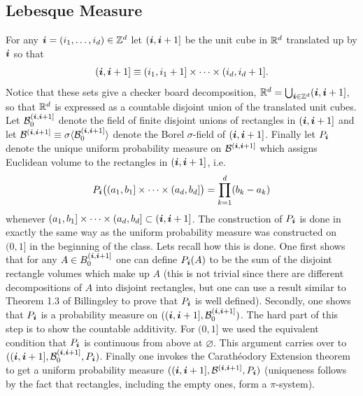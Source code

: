 \subsection{Lebesque Measure}



For any $\boldsymbol i=(i_1,\ldots, i_d)\in\Bbb Z^d$ let $(\boldsymbol i,\boldsymbol i+1]$ be the unit cube in $\Bbb R^d$ translated up by $\boldsymbol i$ so that
\[(\boldsymbol i,\boldsymbol i+1] \equiv (i_1, i_1+1]\times \cdots \times (i_d,i_d + 1].  \]
Notice that these sets give a checker board decomposition, $\Bbb R^d=\bigcup_{\boldsymbol i\in\Bbb Z^d} (\boldsymbol i,\boldsymbol i+1] $, so that $\Bbb R^d$ is expressed as a countable disjoint union of the translated unit cubes. Let $\mathcal B_{0}^{(\boldsymbol i,\boldsymbol i+1] }$ denote the field of finite disjoint unions of rectangles in $(\boldsymbol i,\boldsymbol i+1] $ and let $\mathcal B^{(\boldsymbol i,\boldsymbol i+1] }\equiv \sigma \langle \mathcal B_{0}^{(\boldsymbol i,\boldsymbol i+1] }\rangle $ denote the Borel $\sigma$-field of  $(\boldsymbol i,\boldsymbol i+1]$. Finally let $P_{\boldsymbol i}$ denote the unique uniform probability measure on $\mathcal B^{(\boldsymbol i,\boldsymbol i+1] }$ which assigns Euclidean volume  to the rectangles in  $(\boldsymbol i,\boldsymbol i+1] $, i.e.
\[ P_{\boldsymbol i}\bigl( (a_1,b_1]\times \cdots \times (a_d,b_d]\bigr)=\prod_{k=1}^d (b_k - a_k) \]
whenever $(a_1,b_1]\times \cdots \times (a_d,b_d]\subset (\boldsymbol i,\boldsymbol i+1]$. The construction of $P_{\boldsymbol i}$ is done in exactly the same way as the uniform probability measure was constructed on $(0,1]$ in the beginning of the class. Lets recall how this is done. One first shows that for any $A\in \mathcal \mathcal B_{0}^{(\boldsymbol i,\boldsymbol i+1] }$ one can define $P_{\boldsymbol i}(A)$ to be the sum  of the disjoint rectangle volumes which make up $A$ (this is not trivial since there are different decompositions of $A$ into disjoint rectangles, but one can use a result similar to Theorem 1.3 of Billingsley to prove that $P_{\boldsymbol i}$ is well defined).  Secondly, one shows that $P_{\boldsymbol i}$ is a probability measure on $((\boldsymbol i, \boldsymbol i +1],\mathcal B_{0}^{(\boldsymbol i,\boldsymbol i+1] })$. The hard part of this step is to  show the countable additivity. For $(0,1]$ we used the equivalent condition that  $P_{\boldsymbol i}$ is continuous from above at $\varnothing$. This argument carries over to $((\boldsymbol i, \boldsymbol i +1],\mathcal B_{0}^{(\boldsymbol i,\boldsymbol i+1] }, P_{\boldsymbol i})$. Finally one invokes the Carath\'eodory Extension theorem to get a uniform probability measure $((\boldsymbol i, \boldsymbol i +1],\mathcal B^{(\boldsymbol i,\boldsymbol i+1] }, P_{\boldsymbol i})$ (uniqueness follows by the fact that rectangles, including the empty ones, form a $\pi$-system).

